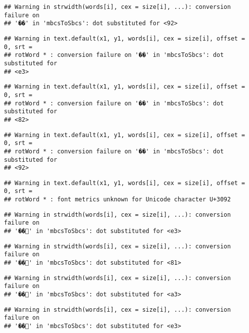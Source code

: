 \documentclass[]{article}
\begin{document}
\begin{verbatim}
## Warning in strwidth(words[i], cex = size[i], ...): conversion failure on
## '��' in 'mbcsToSbcs': dot substituted for <92>
\end{verbatim}

\begin{verbatim}
## Warning in text.default(x1, y1, words[i], cex = size[i], offset = 0, srt =
## rotWord * : conversion failure on '��' in 'mbcsToSbcs': dot substituted for
## <e3>
\end{verbatim}

\begin{verbatim}
## Warning in text.default(x1, y1, words[i], cex = size[i], offset = 0, srt =
## rotWord * : conversion failure on '��' in 'mbcsToSbcs': dot substituted for
## <82>
\end{verbatim}

\begin{verbatim}
## Warning in text.default(x1, y1, words[i], cex = size[i], offset = 0, srt =
## rotWord * : conversion failure on '��' in 'mbcsToSbcs': dot substituted for
## <92>
\end{verbatim}

\begin{verbatim}
## Warning in text.default(x1, y1, words[i], cex = size[i], offset = 0, srt =
## rotWord * : font metrics unknown for Unicode character U+3092
\end{verbatim}

\begin{verbatim}
## Warning in strwidth(words[i], cex = size[i], ...): conversion failure on
## '��' in 'mbcsToSbcs': dot substituted for <e3>
\end{verbatim}

\begin{verbatim}
## Warning in strwidth(words[i], cex = size[i], ...): conversion failure on
## '��' in 'mbcsToSbcs': dot substituted for <81>
\end{verbatim}

\begin{verbatim}
## Warning in strwidth(words[i], cex = size[i], ...): conversion failure on
## '��' in 'mbcsToSbcs': dot substituted for <a3>
\end{verbatim}

\begin{verbatim}
## Warning in strwidth(words[i], cex = size[i], ...): conversion failure on
## '��' in 'mbcsToSbcs': dot substituted for <e3>
\end{verbatim}
\end{document}
